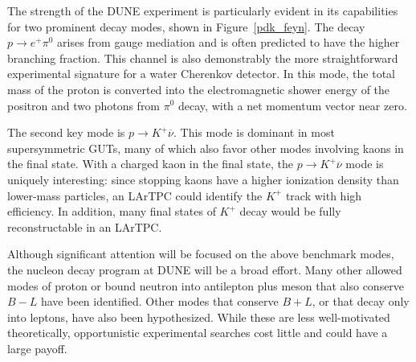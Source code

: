 The strength of the DUNE experiment is particularly evident in its capabilities 
for two prominent decay modes, shown in Figure~\ref{pdk_feyn}. 
The decay $p \rightarrow e^+ \pi^0$ arises from gauge mediation and 
is often predicted to have the higher branching fraction.  This 
channel is also demonstrably the more straightforward 
experimental signature for a water Cherenkov detector.  In this mode,
the total mass of the proton is converted into the electromagnetic
shower energy of the positron and two photons from $\pi^0$ decay,
with a net momentum vector near zero.  

The second key mode is $p \rightarrow K^+ \overline{\nu}$.  This mode is
dominant in most supersymmetric GUTs, many of which also favor other modes
involving kaons in the final state.  With a charged kaon in the final state, 
the $p \rightarrow K^+ \overline{\nu}$ mode is
uniquely interesting: since stopping kaons have a higher ionization density
than lower-mass particles, an LArTPC could identify the $K^+$ track with 
high efficiency.  In addition, many final states of $K^+$ decay would be 
fully reconstructable in an LArTPC.

Although significant attention will be focused on the above benchmark 
modes, the nucleon decay program at DUNE will be a broad effort.
Many other allowed modes of proton or bound neutron into 
antilepton plus meson that also conserve $B-L$ have been identified.  
Other modes that conserve $B+L$, or that decay only into leptons, have also been 
hypothesized.  While these are less well-motivated theoretically, opportunistic 
experimental searches cost little and could have a large payoff.

